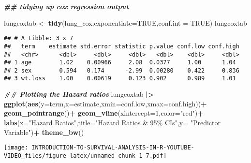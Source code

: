 \documentclass[
]{article}
\newenvironment{Shaded}{\begin{snugshade}}{\end{snugshade}}
\newcommand{\AttributeTok}[1]{\textcolor[rgb]{0.13,0.29,0.53}{#1}}
\newcommand{\ConstantTok}[1]{\textcolor[rgb]{0.56,0.35,0.01}{#1}}
\newcommand{\DecValTok}[1]{\textcolor[rgb]{0.00,0.00,0.81}{#1}}
\newcommand{\DocumentationTok}[1]{\textcolor[rgb]{0.56,0.35,0.01}{\textbf{\textit{#1}}}}
\newcommand{\FunctionTok}[1]{\textcolor[rgb]{0.13,0.29,0.53}{\textbf{#1}}}
\newcommand{\NormalTok}[1]{#1}
\newcommand{\OtherTok}[1]{\textcolor[rgb]{0.56,0.35,0.01}{#1}}
\newcommand{\SpecialCharTok}[1]{\textcolor[rgb]{0.81,0.36,0.00}{\textbf{#1}}}
\newcommand{\StringTok}[1]{\textcolor[rgb]{0.31,0.60,0.02}{#1}}
\begin{document}
\begin{Shaded}
\begin{Highlighting}[]
\DocumentationTok{\#\# tidying up cox regression output}

\NormalTok{lungcoxtab }\OtherTok{\textless{}{-}} \FunctionTok{tidy}\NormalTok{(lung\_cox,}\AttributeTok{exponentiate=}\ConstantTok{TRUE}\NormalTok{,}\AttributeTok{conf.int =} \ConstantTok{TRUE}\NormalTok{)}
\NormalTok{lungcoxtab }
\end{Highlighting}
\end{Shaded}

\begin{verbatim}
## # A tibble: 3 x 7
##   term    estimate std.error statistic p.value conf.low conf.high
##   <chr>      <dbl>     <dbl>     <dbl>   <dbl>    <dbl>     <dbl>
## 1 age        1.02    0.00966     2.08  0.0377     1.00      1.04 
## 2 sex        0.594   0.174      -2.99  0.00280    0.422     0.836
## 3 wt.loss    1.00    0.00619     0.123 0.902      0.989     1.01
\end{verbatim}

\begin{Shaded}
\begin{Highlighting}[]
\DocumentationTok{\#\# Plotting the Hazard ratios}
\NormalTok{lungcoxtab }\SpecialCharTok{|\textgreater{}} 
  \FunctionTok{ggplot}\NormalTok{(}\FunctionTok{aes}\NormalTok{(}\AttributeTok{y=}\NormalTok{term,}\AttributeTok{x=}\NormalTok{estimate,}\AttributeTok{xmin=}\NormalTok{conf.low,}\AttributeTok{xmax=}\NormalTok{conf.high))}\SpecialCharTok{+}
  \FunctionTok{geom\_pointrange}\NormalTok{()}\SpecialCharTok{+}
  \FunctionTok{geom\_vline}\NormalTok{(}\AttributeTok{xintercept=}\DecValTok{1}\NormalTok{,}\AttributeTok{color=}\StringTok{"red"}\NormalTok{)}\SpecialCharTok{+}
  \FunctionTok{labs}\NormalTok{(}\AttributeTok{x=}\StringTok{"Hazard Ratios"}\NormalTok{,}\AttributeTok{title=}\StringTok{"Hazard Ratios \& 95\% CIs"}\NormalTok{,}\AttributeTok{y=} \StringTok{"Predictor Variable"}\NormalTok{)}\SpecialCharTok{+}
  \FunctionTok{theme\_bw}\NormalTok{()}
\end{Highlighting}
\end{Shaded}

\texttt{[image: INTRODUCTION-TO-SURVIVAL-ANALYSIS-IN-R-YOUTUBE-VIDEO\_files/figure-latex/unnamed-chunk-1-7.pdf]}
\end{document}
